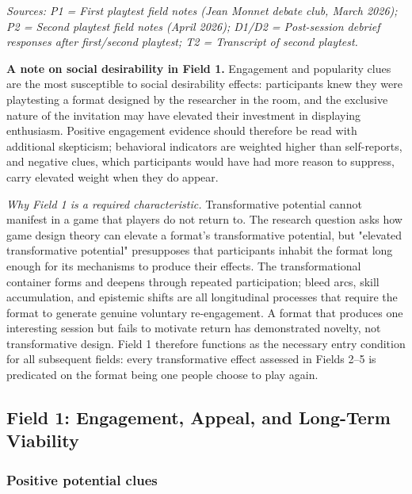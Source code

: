 \textit{Sources: P1 = First playtest field notes (Jean Monnet debate club, March 2026); P2 = Second playtest field notes (April 2026); D1/D2 = Post-session debrief responses after first/second playtest; T2 = Transcript of second playtest.}

\bigskip

\noindent\textbf{A note on social desirability in Field 1.} Engagement and popularity clues are the most susceptible to social desirability effects: participants knew they were playtesting a format designed by the researcher in the room, and the exclusive nature of the invitation may have elevated their investment in displaying enthusiasm. Positive engagement evidence should therefore be read with additional skepticism; behavioral indicators are weighted higher than self-reports, and negative clues, which participants would have had more reason to suppress, carry elevated weight when they do appear.

\bigskip


\noindent\textit{Why Field 1 is a required characteristic.} Transformative potential cannot manifest in a game that players do not return to. The research question asks how game design theory can elevate a format's transformative potential, but "elevated transformative potential" presupposes that participants inhabit the format long enough for its mechanisms to produce their effects. The transformational container forms and deepens through repeated participation; bleed arcs, skill accumulation, and epistemic shifts are all longitudinal processes that require the format to generate genuine voluntary re-engagement. A format that produces one interesting session but fails to motivate return has demonstrated novelty, not transformative design. Field 1 therefore functions as the necessary entry condition for all subsequent fields: every transformative effect assessed in Fields 2--5 is predicated on the format being one people choose to play again.

\bigskip

\subsection*{Field 1: Engagement, Appeal, and Long-Term Viability}

\subsubsection*{Positive potential clues}

